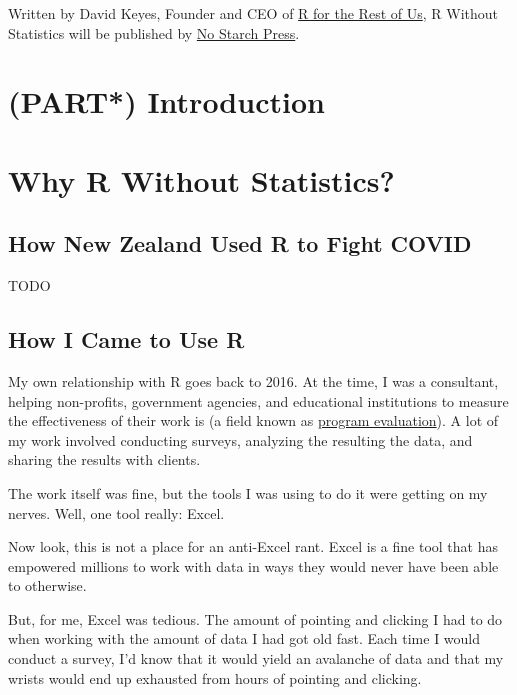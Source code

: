 \documentclass[
]{book}
\begin{document}
Written by David Keyes, Founder and CEO of \href{https://rfortherestofus.com/}{R for the Rest of Us}, R Without Statistics will be published by \href{https://nostarch.com/}{No Starch Press}.

\hypertarget{part-introduction}{%
\chapter{(PART*) Introduction}\label{part-introduction}}

\hypertarget{why-r-without-statistics}{%
\chapter{Why R Without Statistics?}\label{why-r-without-statistics}}

\hypertarget{how-new-zealand-used-r-to-fight-covid}{%
\section{How New Zealand Used R to Fight COVID}\label{how-new-zealand-used-r-to-fight-covid}}

TODO

\hypertarget{how-i-came-to-use-r}{%
\section{How I Came to Use R}\label{how-i-came-to-use-r}}

My own relationship with R goes back to 2016. At the time, I was a consultant, helping non-profits, government agencies, and educational institutions to measure the effectiveness of their work is (a field known as \href{https://www.cdc.gov/evaluation/index.htm}{program evaluation}). A lot of my work involved conducting surveys, analyzing the resulting the data, and sharing the results with clients.

The work itself was fine, but the tools I was using to do it were getting on my nerves. Well, one tool really: Excel.

Now look, this is not a place for an anti-Excel rant. Excel is a fine tool that has empowered millions to work with data in ways they would never have been able to otherwise.

But, for me, Excel was tedious. The amount of pointing and clicking I had to do when working with the amount of data I had got old fast. Each time I would conduct a survey, I'd know that it would yield an avalanche of data and that my wrists would end up exhausted from hours of pointing and clicking.
\end{document}
